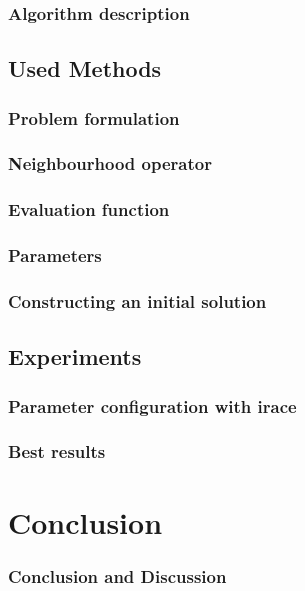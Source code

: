 \documentclass{beamer}
\begin{document}
\begin{frame}
    \frametitle{Algorithm description}


  \end{frame}

\subsection{Used Methods}
\begin{frame}
    \frametitle{Problem formulation}


  \end{frame}

\begin{frame}
    \frametitle{Neighbourhood operator}


\end{frame}

\begin{frame}
    \frametitle{Evaluation function}


  \end{frame}

\begin{frame}
    \frametitle{Parameters}


\end{frame}

\begin{frame}
    \frametitle{Constructing an initial solution}


  \end{frame}

\subsection{Experiments}

\begin{frame}
    \frametitle{Parameter configuration with irace}


  \end{frame}

\begin{frame}
    \frametitle{Best results}


  \end{frame}




  \section{Conclusion}
  \begin{frame}
    \frametitle{Conclusion and Discussion}


  \end{frame}
\end{document}
